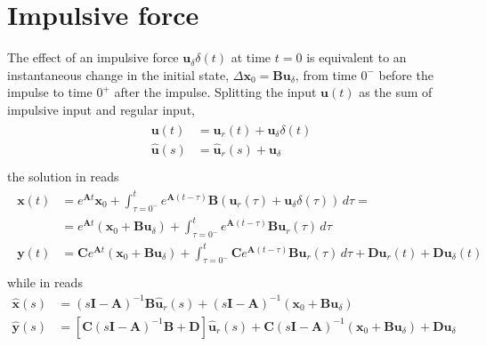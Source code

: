 \documentclass[letterpaper,10pt,english]{jupyterBook}
\begin{document}
\section{Impulsive force}
\label{\detokenize{ch/system-theory/lti:impulsive-force}}\label{\detokenize{ch/system-theory/lti:ode-lti-impulsive-force}}
\sphinxAtStartPar
The effect of an impulsive force \(\mathbf{u}_{\delta} \delta(t)\) at time \(t=0\) is equivalent to an instantaneous change in the initial state, \(\Delta \mathbf{x}_0 = \mathbf{B} \mathbf{u}_{\delta}\), from time \(0^-\) before the impulse to time \(0^+\) after the impulse. Splitting the input \(\mathbf{u}(t)\) as the sum of impulsive input and regular input,
\begin{equation*}
\begin{split}\begin{aligned}
  \mathbf{u}(t) & = \mathbf{u}_r(t) + \mathbf{u}_\delta \delta(t) \\
  \hat{\mathbf{u}}(s) & = \hat{\mathbf{u}}_r(s) + \mathbf{u}_\delta \\
\end{aligned}\end{split}
\end{equation*}
\sphinxAtStartPar
the solution in  reads
\begin{equation*}
\begin{split}\begin{aligned}
  \mathbf{x}(t)
  & = e^{\mathbf{A}t} \mathbf{x}_0 + \int_{\tau=0^-}^{t} e^{\mathbf{A}(t-\tau)} \mathbf{B} \left( \mathbf{u}_r (\tau) + \mathbf{u}_\delta \delta(\tau) \right) \, d \tau = \\ 
  & = e^{\mathbf{A}t} \left( \mathbf{x}_0 + \mathbf{B} \mathbf{u}_\delta \right) + \int_{\tau=0^-}^{t} e^{\mathbf{A}(t-\tau)} \mathbf{B} \mathbf{u}_r (\tau) \, d \tau \\
  \mathbf{y}(t)
  & = \mathbf{C} e^{\mathbf{A}t} \left( \mathbf{x}_0 + \mathbf{B} \mathbf{u}_\delta \right) + \int_{\tau=0^-}^{t} \mathbf{C} e^{\mathbf{A}(t-\tau)} \mathbf{B} \mathbf{u}_r (\tau) \, d \tau + \mathbf{D} \mathbf{u}_r(t) + \mathbf{D} \mathbf{u}_\delta(t) \\
\end{aligned}\end{split}
\end{equation*}
\sphinxAtStartPar
while in  reads
\begin{equation*}
\begin{split}
  \hat{\mathbf{x}}(s) & = (s\mathbf{I} - \mathbf{A})^{-1} \mathbf{B} \hat{\mathbf{u}}_r(s) + (s\mathbf{I} - \mathbf{A})^{-1} \left( \mathbf{x}_0 + \mathbf{B} \mathbf{u}_\delta \right) \\
  \hat{\mathbf{y}}(s) & = \left[ \mathbf{C} (s\mathbf{I} - \mathbf{A})^{-1} \mathbf{B} + \mathbf{D} \right] \hat{\mathbf{u}}_r(s) + \mathbf{C} (s\mathbf{I} - \mathbf{A})^{-1} \left( \mathbf{x}_0 + \mathbf{B} \mathbf{u}_\delta \right) + \mathbf{D} \mathbf{u}_{\delta}
\end{split}
\end{equation*}
\end{document}
